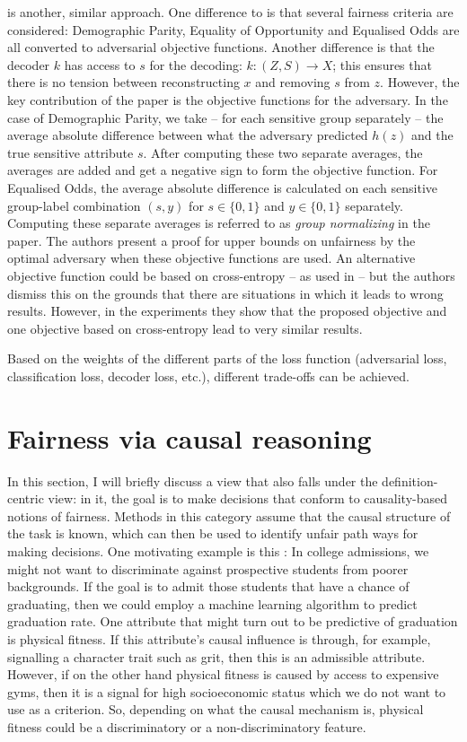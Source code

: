 \citet{madras2018learning} is another, similar approach.
One difference to \citet{edwards2016censoring} is that several fairness criteria are considered:
Demographic Parity, Equality of Opportunity and Equalised Odds are all converted to adversarial objective functions.
Another difference is that the decoder \(k\) has access to \(s\) for the decoding: \(k: (Z, S)\to X\);
this ensures that there is no tension between reconstructing \(x\) and removing \(s\) from \(z\).
However, the key contribution of the paper is the objective functions for the adversary.
In the case of Demographic Parity, we take -- for each sensitive group separately --
the average absolute difference between what the adversary predicted \(h(z)\) and the true sensitive attribute \(s\).
After computing these two separate averages,
the averages are added and get a negative sign to form the objective function.
For Equalised Odds,
the average absolute difference is calculated on each sensitive group-label combination
\((s, y)\) for \(s \in \{0, 1\}\) and \(y \in \{0, 1\}\) separately.
Computing these separate averages is referred to as \emph{group normalizing} in the paper.
The authors present a proof for upper bounds on unfairness by the optimal adversary
when these objective functions are used.
An alternative objective function could be based on cross-entropy -- as used in \citet{edwards2016censoring} --
but the authors dismiss this on the grounds that there are situations in which it leads to wrong results.
However, in the experiments they show
that the proposed objective and one objective based on cross-entropy lead to very similar results.

Based on the weights of the different parts of the loss function
(adversarial loss, classification loss, decoder loss, etc.),
different trade-offs can be achieved.

\section{Fairness via causal reasoning}%
\label{sec:fairness-definition-based-on-causal-reasoning}
In this section, I will briefly discuss a view that also falls under the definition-centric view:
in it, the goal is to make decisions that conform to causality-based notions of fairness.
Methods in this category assume that the causal structure of the task is known,
which can then be used to identify unfair path ways for making decisions.
One motivating example is this \citep{dedeo2014wrong}:
In college admissions, we might not want to discriminate against prospective students from poorer backgrounds.
If the goal is to admit those students that have a chance of graduating,
then we could employ a machine learning algorithm to predict graduation rate.
One attribute that might turn out to be predictive of graduation is physical fitness.
If this attribute's causal influence is through,
for example, signalling a character trait such as grit,
then this is an admissible attribute.
However, if on the other hand physical fitness is caused by access to expensive gyms,
then it is a signal for high socioeconomic status which we do not want to use as a criterion.
So, depending on what the causal mechanism is,
physical fitness could be a discriminatory or a non-discriminatory feature.


